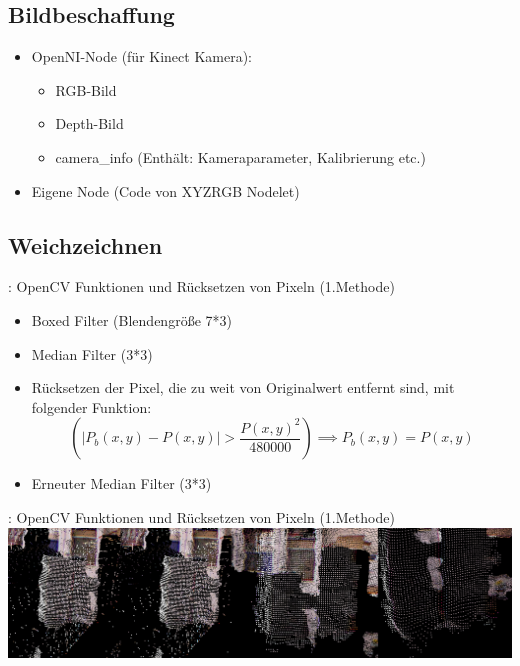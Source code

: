 \documentclass{VLKlauck}
\begin{document}
	\subsection{Bildbeschaffung}
	\begin{frame}{\insertsubsection}
		\begin{itemize}
		  \item OpenNI-Node (für Kinect Kamera):
		  \begin{itemize}	
		    \item RGB-Bild
		    \item Depth-Bild
		    \item camera\_info (Enthält: Kameraparameter, Kalibrierung etc.)
		  \end{itemize}
		  \item Eigene Node (Code von XYZRGB Nodelet)
		\end{itemize}
	\end{frame}
	
	
	
	
	\subsection{Weichzeichnen}
	\begin{frame}{\insertsubsection: OpenCV Funktionen und Rücksetzen von Pixeln (1.Methode)}
	\begin{itemize}
     \item Boxed Filter (Blendengröße 7*3)
     \item Median Filter (3*3)
     \item Rücksetzen der Pixel, die zu weit von Originalwert entfernt sind, mit folgender Funktion:\\
   			$$
      			\left(\left|{P_b(x,y)-P(x,y)}\right|>{\frac{P(x,y)^2}{480000}}\right)\implies P_b(x,y)=P(x,y)
			$$
	 \item Erneuter Median Filter (3*3)
    \end{itemize}
	\end{frame}
	
	\begin{frame}{\insertsubsection: OpenCV Funktionen und Rücksetzen von Pixeln (1.Methode)}
			\includegraphics[width=\textwidth]{myFilter1.png}
	\end{frame}
	 
\end{document}
